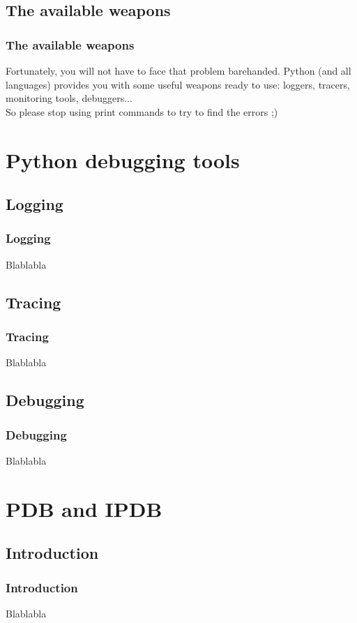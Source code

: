 \subsection{The available weapons}
\begin{frame}
\frametitle{The available weapons}	
Fortunately, you will not have to face that problem barehanded. Python (and all languages) provides you with some useful weapons ready to use: loggers, tracers, monitoring tools, debuggers...\\

So please stop using print commands to try to find the errors ;)\\



\end{frame}

\section{Python debugging tools}

\subsection{Logging}
\begin{frame}
\frametitle{Logging}	
Blablabla
\end{frame}

\subsection{Tracing}
\begin{frame}
\frametitle{Tracing}	
Blablabla
\end{frame}

\subsection{Debugging}
\begin{frame}
\frametitle{Debugging}	
Blablabla
\end{frame}



\section{PDB and IPDB}

\subsection{Introduction}
\begin{frame}
\frametitle{Introduction}	
Blablabla
\end{frame}

